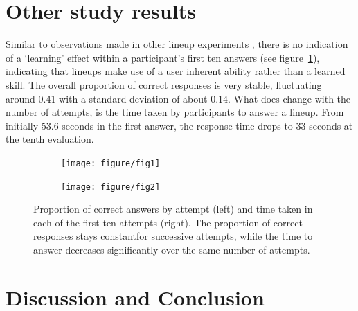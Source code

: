 \documentclass{article}\usepackage[]{graphicx}\usepackage[]{color}
\newenvironment{knitrout}{}{} %
\begin{document}
\section{Other study results}



 Similar to observations made in other lineup experiments \citep{Majumder:2014up}, there is no indication of a `learning' effect within a participant's first ten answers (see figure~\ref{fig:attempts}), indicating that lineups make use of a user inherent ability rather than a learned skill. The overall proportion of correct responses is very stable, fluctuating around 0.41 with a standard deviation of about 0.14.  What does change with the number of attempts, is the time taken by participants to answer a lineup. From initially 53.6 seconds in the first answer, the response time drops to 33 seconds at the tenth evaluation.
\begin{figure}
\centering
\begin{subfigure}[b]{.3\textwidth}
\begin{knitrout}
\color{fgcolor}
\texttt{[image: figure/fig1]} 

\end{knitrout}

\end{subfigure}
\begin{subfigure}[b]{.3\textwidth}
\begin{knitrout}
\color{fgcolor}
\texttt{[image: figure/fig2]} 

\end{knitrout}

\end{subfigure}
\caption{\label{fig:attempts}Proportion of correct answers by attempt (left) and time taken in each of the first ten attempts (right). The proportion of correct responses stays constantfor successive attempts, while the time to answer decreases significantly over the same number of attempts.}
\end{figure}

\section{Discussion and Conclusion}
\end{document}
